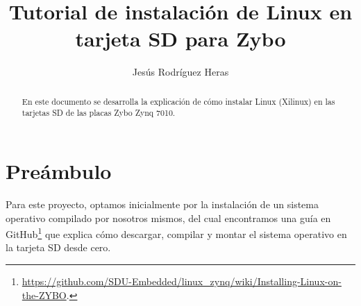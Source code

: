 \documentclass[12pt,letterpaper]{article}
\title{Tutorial de instalación de Linux en tarjeta SD para Zybo}
\author{Jesús Rodríguez Heras}
\begin{document}
	
	\maketitle
	\begin{abstract} %
		\begin{center}
			En este documento se desarrolla la explicación de cómo instalar Linux (Xilinux) en las tarjetas SD de las placas Zybo Zynq 7010.
		\end{center}
	\end{abstract}
	\thispagestyle{empty}
	\newpage
	
	\tableofcontents
	\newpage
	
	
	
	
	\lstset{language=bash, numbers=left, numberstyle=\tiny, numbersep=10pt, firstnumber=1, stepnumber=1, basicstyle=\small\ttfamily, tabsize=1, extendedchars=true, inputencoding=latin1}

\section{Preámbulo}
Para este proyecto, optamos inicialmente por la instalación de un sistema operativo compilado por nosotros mismos, del cual encontramos una guía en GitHub\footnote{\url{https://github.com/SDU-Embedded/linux_zynq/wiki/Installing-Linux-on-the-ZYBO}.} que explica cómo descargar, compilar y montar el sistema operativo en la tarjeta SD desde cero.
\end{document}
